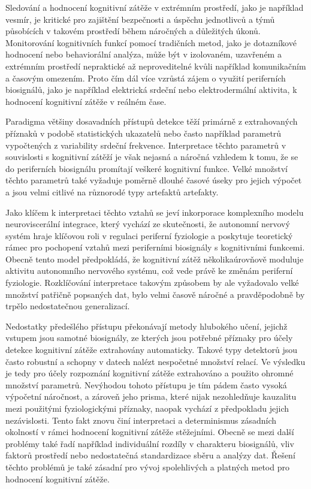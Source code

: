 Sledování a hodnocení kognitivní zátěže v extrémním prostředí, jako je například
vesmír, je kritické pro zajištění bezpečnosti a úspěchu jednotlivců a týmů
působících v takovém prostředí během náročných a důležitých úkonů. Monitorování
kognitivních funkcí pomocí tradičních metod, jako je dotazníkové hodnocení nebo
behaviorální analýza, může být v izolovaném, uzavřeném a extrémním prostředí
nepraktické až neproveditelné kvůli například komunikačním a časovým omezením.
Proto čím dál více vzrůstá zájem o využití periferních biosignálů, jako je
například elektrická srdeční nebo elektrodermální aktivita, k hodnocení
kognitivní zátěže v reálném čase. 

Paradigma většiny dosavadních přístupů detekce těží primárně z extrahovaných
příznaků v podobě statistických ukazatelů nebo často například parametrů
vypočtených z variability srdeční frekvence. Interpretace těchto parametrů v
souvislosti s kognitivní zátěží je však nejasná a náročná vzhledem k tomu, že se
do periferních biosignálu promítají veškeré kognitivní funkce. Velké množství
těchto parametrů také vyžaduje poměrně dlouhé časové úseky pro jejich výpočet a
jsou velmi citlivé na různorodé typy artefaktů artefakty.

Jako klíčem k interpretaci těchto vztahů se jeví inkorporace komplexního modelu
neuroviscerální integrace, který vychází ze skutečnosti, že autonomní nervový
systém hraje klíčovou roli v regulaci periferní fyziologie a poskytuje
teoretický rámec pro pochopení vztahů mezi periferními biosignály s kognitivními
funkcemi. Obecně tento model předpokládá, že kognitivní zátěž několikaúrovňově
moduluje aktivitu autonomního nervového systému, což vede právě ke změnám
periferní fyziologie. Rozklíčování interpretace takovým způsobem by ale
vyžadovalo velké množství patřičně popsaných dat, bylo velmi časově náročné a
pravděpodobně by trpělo nedostatečnou generalizací.

Nedostatky předešlého přístupu překonávají metody hlubokého učení, jejichž
vstupem jsou samotné biosignály, ze kterých jsou potřebné příznaky pro účely
detekce kognitivní zátěže extrahovány automaticky. Takové typy detektorů jsou
často robustní a schopny v datech nalézt nespočetné množství relací. Ve výsledku
je tedy pro účely rozpoznání kognitivní zátěže extrahováno a použito ohromné
množství parametrů. Nevýhodou tohoto přístupu je tím pádem často vysoká
výpočetní náročnost, a zároveň jeho prisma, které nijak nezohledňuje kauzalitu
mezi použitými fyziologickými příznaky, naopak vychází z předpokladu jejich
nezávislosti. Tento fakt znovu činí interpretaci a determinismus zásadních
okolností v rámci hodnocení kognitivní zátěže stěžejními. Obecně se mezi další
problémy také řadí například individuální rozdíly v charakteru biosignálů, vliv
faktorů prostředí nebo nedostatečná standardizace sběru a analýzy dat. Řešení
těchto problémů je také zásadní pro vývoj spolehlivých a platných metod pro
hodnocení kognitivní zátěže.

